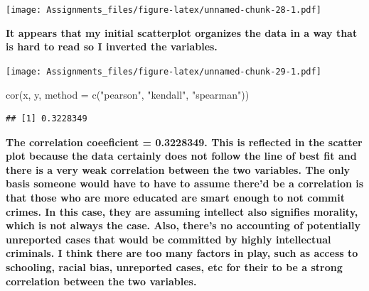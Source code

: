 \documentclass[
]{article}
\newenvironment{Shaded}{\begin{snugshade}}{\end{snugshade}}
\newcommand{\AttributeTok}[1]{\textcolor[rgb]{0.77,0.63,0.00}{#1}}
\newcommand{\ConstantTok}[1]{\textcolor[rgb]{0.00,0.00,0.00}{#1}}
\newcommand{\DecValTok}[1]{\textcolor[rgb]{0.00,0.00,0.81}{#1}}
\newcommand{\FunctionTok}[1]{\textcolor[rgb]{0.00,0.00,0.00}{#1}}
\newcommand{\NormalTok}[1]{#1}
\newcommand{\OtherTok}[1]{\textcolor[rgb]{0.56,0.35,0.01}{#1}}
\newcommand{\SpecialCharTok}[1]{\textcolor[rgb]{0.00,0.00,0.00}{#1}}
\newcommand{\StringTok}[1]{\textcolor[rgb]{0.31,0.60,0.02}{#1}}
\begin{document}
\texttt{[image: Assignments\_files/figure-latex/unnamed-chunk-28-1.pdf]}

\textbf{It appears that my initial scatterplot organizes the data in a
way that is hard to read so I inverted the variables.}

\begin{Shaded}
\end{Shaded}

\texttt{[image: Assignments\_files/figure-latex/unnamed-chunk-29-1.pdf]}

\begin{Shaded}
\begin{Highlighting}[]
\FunctionTok{cor}\NormalTok{(x, y, }\AttributeTok{method =} \FunctionTok{c}\NormalTok{(}\StringTok{"pearson"}\NormalTok{, }\StringTok{"kendall"}\NormalTok{, }\StringTok{"spearman"}\NormalTok{))}
\end{Highlighting}
\end{Shaded}

\begin{verbatim}
## [1] 0.3228349
\end{verbatim}

\textbf{The correlation coeeficient = 0.3228349. This is reflected in
the scatter plot because the data certainly does not follow the line of
best fit and there is a very weak correlation between the two variables.
The only basis someone would have to have to assume there'd be a
correlation is that those who are more educated are smart enough to not
commit crimes. In this case, they are assuming intellect also signifies
morality, which is not always the case. Also, there's no accounting of
potentially unreported cases that would be committed by highly
intellectual criminals. I think there are too many factors in play, such
as access to schooling, racial bias, unreported cases, etc for their to
be a strong correlation between the two variables. }
\end{document}
